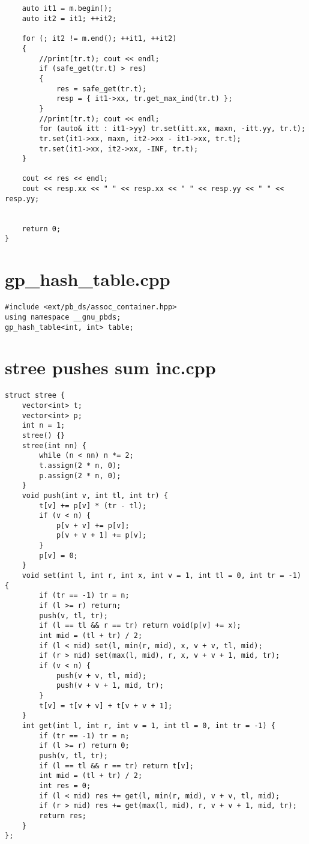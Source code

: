 \documentclass[a4paper,12pt]{report}
\begin{document}
\begin{lstlisting}
    

    auto it1 = m.begin();
    auto it2 = it1; ++it2;

    for (; it2 != m.end(); ++it1, ++it2)
    {
        //print(tr.t); cout << endl;
        if (safe_get(tr.t) > res)
        {
            res = safe_get(tr.t);
            resp = { it1->xx, tr.get_max_ind(tr.t) };
        }
        //print(tr.t); cout << endl;
        for (auto& itt : it1->yy) tr.set(itt.xx, maxn, -itt.yy, tr.t);
        tr.set(it1->xx, maxn, it2->xx - it1->xx, tr.t);
        tr.set(it1->xx, it2->xx, -INF, tr.t);
    }

    cout << res << endl;
    cout << resp.xx << " " << resp.xx << " " << resp.yy << " " << resp.yy;


    return 0;
}
\end{lstlisting}


\section{gp_hash_table.cpp}
\begin{lstlisting}
#include <ext/pb_ds/assoc_container.hpp>
using namespace __gnu_pbds;
gp_hash_table<int, int> table;

\end{lstlisting}


\section{stree pushes sum inc.cpp}
\begin{lstlisting}
struct stree {
    vector<int> t;
    vector<int> p;
    int n = 1;
    stree() {}
    stree(int nn) {
        while (n < nn) n *= 2;
        t.assign(2 * n, 0);
        p.assign(2 * n, 0);
    }
    void push(int v, int tl, int tr) {
        t[v] += p[v] * (tr - tl);
        if (v < n) {
            p[v + v] += p[v];
            p[v + v + 1] += p[v];
        }
        p[v] = 0;
    }
    void set(int l, int r, int x, int v = 1, int tl = 0, int tr = -1) {
        if (tr == -1) tr = n;
        if (l >= r) return;
        push(v, tl, tr);
        if (l == tl && r == tr) return void(p[v] += x);
        int mid = (tl + tr) / 2;
        if (l < mid) set(l, min(r, mid), x, v + v, tl, mid);
        if (r > mid) set(max(l, mid), r, x, v + v + 1, mid, tr);
        if (v < n) {
            push(v + v, tl, mid);
            push(v + v + 1, mid, tr);
        }
        t[v] = t[v + v] + t[v + v + 1];
    }
    int get(int l, int r, int v = 1, int tl = 0, int tr = -1) {
        if (tr == -1) tr = n;
        if (l >= r) return 0;
        push(v, tl, tr);
        if (l == tl && r == tr) return t[v];
        int mid = (tl + tr) / 2;
        int res = 0;
        if (l < mid) res += get(l, min(r, mid), v + v, tl, mid);
        if (r > mid) res += get(max(l, mid), r, v + v + 1, mid, tr);
        return res;
    }
};
\end{lstlisting}
\end{document}
